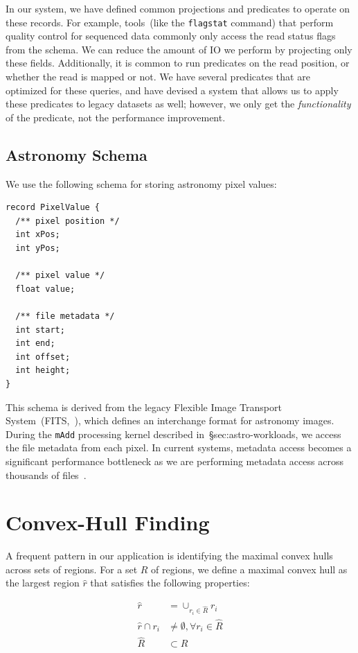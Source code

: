 \documentclass{acm_proc_article-sp}
\begin{document}
In our system, we have defined common projections and predicates to operate on these records. For
example, tools~(like the \texttt{flagstat} command) that perform quality control for sequenced data
commonly only access the read status flags from the schema. We can reduce the amount of IO we
perform by projecting only these fields. Additionally, it is common to run predicates on the read position,
or whether the read is mapped or not. We have several predicates that are optimized for these queries,
and have devised a system that allows us to apply these predicates to legacy datasets as well; however,
we only get the \emph{functionality} of the predicate, not the performance improvement.

\subsection{Astronomy Schema}
\label{sec:astronomy-schema}

We use the following schema for storing astronomy pixel values:

\begin{lstlisting}
record PixelValue {
  /** pixel position */
  int xPos;
  int yPos;
  
  /** pixel value */
  float value;
  
  /** file metadata */
  int start;
  int end;
  int offset;
  int height;
}
\end{lstlisting}

This schema is derived from the legacy Flexible Image Transport System~(FITS,~\cite{wells81}), which
defines an interchange format for astronomy images. During the \texttt{mAdd} processing kernel
described in~\S{sec:astro-workloads}, we access the file metadata from each pixel. In current systems,
metadata access becomes a significant performance bottleneck as we are performing metadata access
across thousands of files~\cite{zhang13}.

\section{Convex-Hull Finding}
\label{sec:convex-hull}

A frequent pattern in our application is identifying the maximal convex hulls across sets of regions. For
a set $R$ of regions, we define a maximal convex hull as the largest region $\hat{r}$ that satisfies the
following properties:

\begin{align}
\label{eqn:convexity-constraint}
\hat{r} &= \cup_{r_i \in \hat{R}} r_i \\
\hat{r} \cap r_i &\ne \emptyset, \forall r_i \in \hat{R} \\
\hat{R} &\subset R
\end{align}
\end{document}
